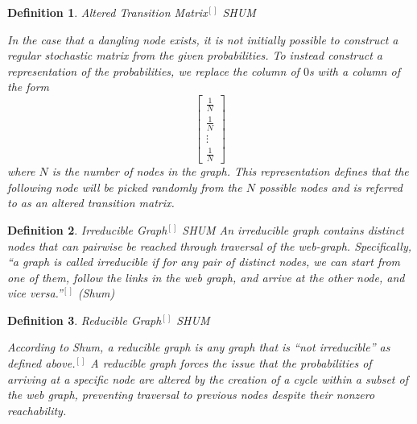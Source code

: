 \documentclass{article}
\newtheorem{definition}{Definition}
\begin{document}
    \begin{definition}{Altered Transition Matrix$^{[]}$ SHUM}
    
    \noindent
    \textup{In the case that a dangling node exists, it is not initially possible to construct a regular stochastic matrix from the given probabilities. To instead construct a representation of the probabilities, we replace the column of $0$s with a column of the form
    $$\begin{bmatrix} \frac{1}{N} \\ \frac{1}{N} \\ \vdots \\ \frac{1}{N} \end{bmatrix}$$ where $N$ is the number of nodes in the graph. This representation defines that the following node will be picked randomly from the $N$ possible nodes and is referred to as an altered transition matrix.}
    
    \end{definition}
    
    \begin{definition}{Irreducible Graph$^{[]}$ SHUM}
    \noindent
    \textup{An irreducible graph contains distinct nodes that can pairwise be reached through traversal of the web-graph. Specifically, ``a graph is called irreducible if for any pair of distinct nodes, we can start from one of them, follow  the links in the web graph, and arrive at the other node, and vice versa.''$^{[]}$ (Shum)}
    
    \end{definition}
    
    \begin{definition}{Reducible Graph$^{[]}$ SHUM}

    \noindent
    \textup{According to Shum, a reducible graph is any graph that is ``not irreducible'' as defined above.$^{[]}$ A reducible graph forces the issue that the probabilities of arriving at a specific node are altered by the creation of a cycle within a subset of the web graph, preventing traversal to previous nodes despite their nonzero reachability.}
    
    \end{definition}
    
\end{document}
